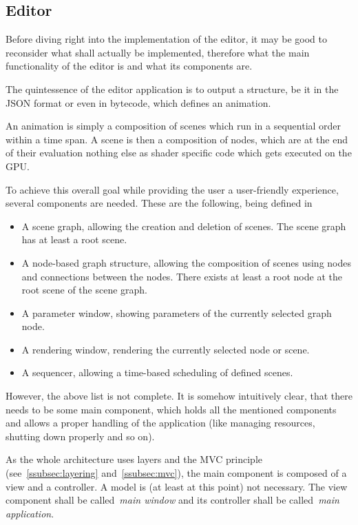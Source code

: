 \documentclass[
    a4paper,      %
    10pt,         %
    openright,    %
    notitlepage,  %
    parskip=half, %
]{scrreprt}       %
\theoremstyle{definition}                    %
\begin{document}
\subsection{Editor}
\label{subsec:editor}

Before diving right into the implementation of the editor, it may be good to
reconsider what shall actually be implemented, therefore what the main
functionality of the editor is and what its components are.

The quintessence of the editor application is to output a structure, be it in
the JSON format or even in bytecode, which defines an animation.

An animation is simply a composition of scenes which run in a sequential order
within a time span. A scene is then a composition of nodes, which are at the end
of their evaluation nothing else as shader specific code which gets executed on
the GPU.


To achieve this overall goal while providing the user a user-friendly
experience, several components are needed. These are the following, being
defined in~

\begin{itemize}
\item A scene graph, allowing the creation and deletion of scenes. The scene graph
      has at least a root scene.
\item A node-based graph structure, allowing the composition of scenes using nodes
      and connections between the nodes. There exists at least a root node at
      the root scene of the scene graph.
\item A parameter window, showing parameters of the currently selected graph node.
\item A rendering window, rendering the currently selected node or scene.
\item A sequencer, allowing a time-based scheduling of defined scenes.
\end{itemize}

However, the above list is not complete. It is somehow intuitively clear, that
there needs to be some main component, which holds all the mentioned components
and allows a proper handling of the application (like managing resources,
shutting down properly and so on).

As the whole architecture uses layers and the MVC principle
(see~\autoref{ssubsec:layering} and~\autoref{ssubsec:mvc}), the main component is
composed of a view and a controller. A model is (at least at this point) not
necessary. The view component shall be called~\textit{main window} and its
controller shall be called~\textit{main application}.
\end{document}

